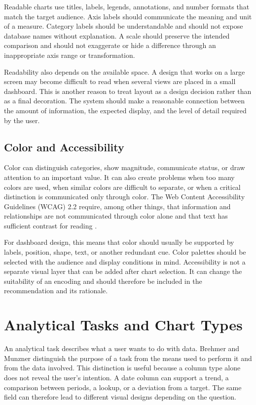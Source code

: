 Readable charts use titles, labels, legends, annotations, and number formats that match the target audience. Axis labels should communicate the meaning and unit of a measure. Category labels should be understandable and should not expose database names without explanation. A scale should preserve the intended comparison and should not exaggerate or hide a difference through an inappropriate axis range or transformation.

Readability also depends on the available space. A design that works on a large screen may become difficult to read when several views are placed in a small dashboard. This is another reason to treat layout as a design decision rather than as a final decoration. The system should make a reasonable connection between the amount of information, the expected display, and the level of detail required by the user.

\subsection{Color and Accessibility}

Color can distinguish categories, show magnitude, communicate status, or draw attention to an important value. It can also create problems when too many colors are used, when similar colors are difficult to separate, or when a critical distinction is communicated only through color. The Web Content Accessibility Guidelines (WCAG) 2.2 require, among other things, that information and relationships are not communicated through color alone and that text has sufficient contrast for reading \cite{wcag2024}.

For dashboard design, this means that color should usually be supported by labels, position, shape, text, or another redundant cue. Color palettes should be selected with the audience and display conditions in mind. Accessibility is not a separate visual layer that can be added after chart selection. It can change the suitability of an encoding and should therefore be included in the recommendation and its rationale.

\section{Analytical Tasks and Chart Types}

An analytical task describes what a user wants to do with data. Brehmer and Munzner \cite{brehmer2013typology} distinguish the purpose of a task from the means used to perform it and from the data involved. This distinction is useful because a column type alone does not reveal the user's intention. A date column can support a trend, a comparison between periods, a lookup, or a deviation from a target. The same field can therefore lead to different visual designs depending on the question.

